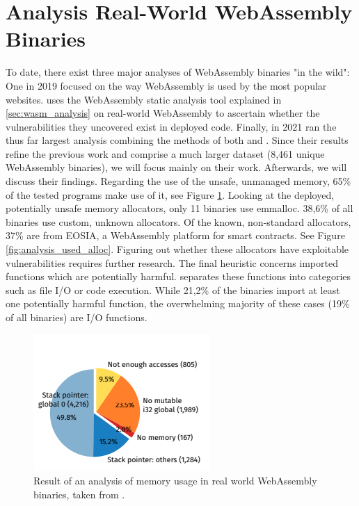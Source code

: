 \documentclass[sigconf]{acmart}
\begin{document}
\section{Analysis Real-World WebAssembly Binaries}
To date, there exist three major analyses of WebAssembly binaries "in the wild": One in 2019 \cite{musch_new_2019} focused on the way WebAssembly is used by the most popular websites. \cite{lehmann_everything_2020} uses the WebAssembly static analysis tool explained in \ref{sec:wasm_analysis} on real-world WebAssembly to ascertain whether the vulnerabilities they uncovered exist in deployed code. Finally, in 2021 \cite{hilbig_empirical_2021} ran the thus far largest analysis combining the methods of both \cite{musch_new_2019} and \cite{lehmann_everything_2020}. Since their results refine the previous work and comprise a much larger dataset (8,461 unique WebAssembly binaries), we will focus mainly on their work. Afterwards, we will discuss their findings. Regarding the use of the unsafe, unmanaged memory, 65\% of the tested programs make use of it, see Figure \ref{fig:analysis_unmanaged_stack}. Looking at the deployed, potentially unsafe memory allocators, only 11 binaries use emmalloc. 38,6\% of all binaries use custom, unknown allocators. Of the known, non-standard allocators, 37\% are from EOSIA, a WebAssembly platform for smart contracts. See Figure \ref{fig:analysis_used_alloc}. Figuring out whether these allocators have exploitable vulnerabilities requires further research. The final heuristic concerns imported functions which are potentially harmful. \cite{hilbig_empirical_2021} separates these functions into categories such as file I/O or code execution. While 21,2\% of the binaries import at least one potentially harmful function, the overwhelming majority of these cases (19\% of all binaries) are I/O functions. 

\begin{figure}[h]
  \centering
  \includegraphics[scale=1]{analysis_unmanaged_stack}
  \caption{Result of an analysis of memory usage in real world WebAssembly binaries, taken from \cite{hilbig_empirical_2021}.}  
\label{fig:analysis_unmanaged_stack}
\end{figure}
\end{document}
